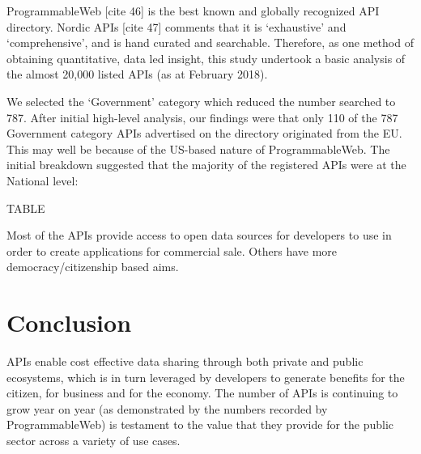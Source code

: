 ProgrammableWeb [cite 46] is the best known and globally recognized API directory.
Nordic APIs [cite 47] comments that it is ‘exhaustive’ and ‘comprehensive’, and is hand
curated and searchable. Therefore, as one method of obtaining quantitative,
data led insight, this study undertook a basic analysis of the almost 20,000
listed APIs (as at February 2018).

We selected the ‘Government’ category which reduced the number searched to 787.
After initial high-level analysis, our findings were that only 110 of the 787
Government category APIs advertised on the directory originated from the EU.
This may well be because of the US-based nature of ProgrammableWeb. The initial
breakdown suggested that the majority of the registered APIs were at the
National level:


TABLE

Most of the APIs provide access to open data sources for developers to use in
order to create applications for commercial sale. Others have more
democracy/citizenship based aims.

\section{Conclusion}

APIs enable cost effective data sharing through both private and public
ecosystems, which is in turn leveraged by developers to generate benefits for
the citizen, for business and for the economy. The number of APIs is continuing
to grow year on year (as demonstrated by the numbers recorded by ProgrammableWeb)
is testament to the value that they provide for the public sector across a variety
of use cases.
